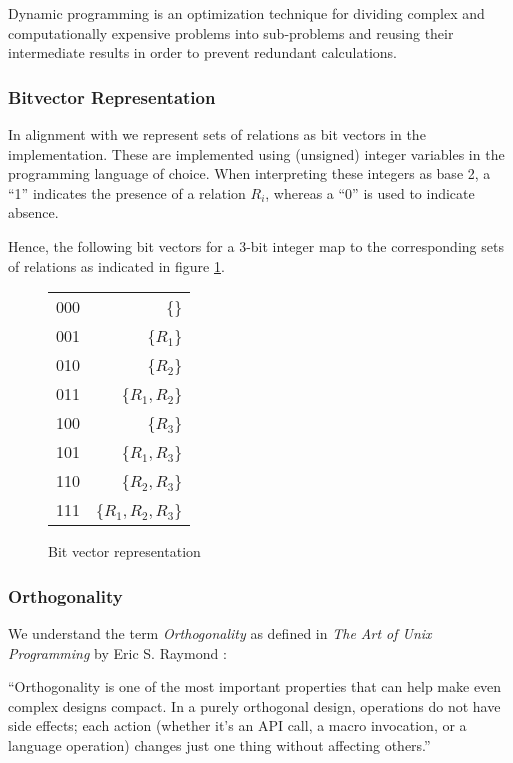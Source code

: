 Dynamic programming is an optimization technique for dividing complex and computationally expensive problems into sub-problems and reusing their intermediate results in order to prevent redundant calculations.

\subsubsection{Bitvector Representation}
\label{subsub:basics-bitvector}

In alignment with \cite{moerkotte2009building} we represent sets of relations as bit vectors in the implementation. These are implemented using (unsigned) integer variables in the programming language of choice. When interpreting these integers as base 2, a ``1'' indicates the presence of a relation $R_i$, whereas a ``0'' is used to indicate absence.

\begin{example}
    Hence, the following bit vectors for a 3-bit integer map to the corresponding sets of relations as indicated in figure \ref{fig:bitvector}.
    \begin{figure}[H]
        \begin{tabular}{ c | r }
            000 & \{\} \\ 
            001 & \{$R_1$\} \\
            010 & \{$R_2$\} \\
            011 & \{$R_1,R_2$\} \\
            100 & \{$R_3$\} \\
            101 & \{$R_1,R_3$\} \\
            110 & \{$R_2,R_3$\} \\
            111 & \{$R_1,R_2,R_3$\} \\
           \end{tabular}
        \caption{Bit vector representation}
        \label{fig:bitvector}
    \end{figure}
\end{example}

\subsubsection{Orthogonality}
We understand the term \textit{Orthogonality} as defined in \textit{The Art of Unix Programming} by Eric S. Raymond \cite{raymond2003compactness}:
\begin{definition}
    ``Orthogonality is one of the most important properties that can help make even complex designs compact. In a purely orthogonal design, operations do not have side effects; each action (whether it's an API call, a macro invocation, or a language operation) changes just one thing without affecting others.''
\end{definition}

